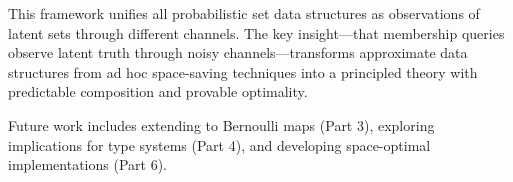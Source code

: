 \documentclass[11pt,final,hidelinks]{article}
\begin{document}
This framework unifies all probabilistic set data structures as observations of latent sets through different channels. The key insight—that membership queries observe latent truth through noisy channels—transforms approximate data structures from ad hoc space-saving techniques into a principled theory with predictable composition and provable optimality.

Future work includes extending to Bernoulli maps (Part 3), exploring implications for type systems (Part 4), and developing space-optimal implementations (Part 6).



\end{document}
